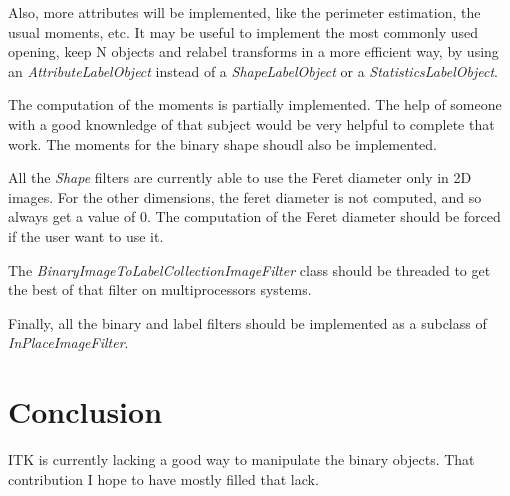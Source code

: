 \documentclass{InsightArticle}
\begin{document}
Also, more attributes will be implemented, like the perimeter estimation, the usual moments, etc. It may be useful to implement the most commonly used opening, keep N objects and relabel transforms in a more efficient way, by using an {\em AttributeLabelObject} instead of a {\em ShapeLabelObject} or a {\em StatisticsLabelObject}.

The computation of the moments is partially implemented. The help of someone with a good knownledge of that subject would be very helpful to complete that work. The moments for the binary shape shoudl also be implemented.

All the {\em Shape} filters are currently able to use the Feret diameter only in 2D images. For the other dimensions, the feret diameter is not computed, and so always get a value of $0$. The computation of the Feret diameter should be forced if the user want to use it.

The {\em BinaryImageToLabelCollectionImageFilter} class should be threaded to get the best of that filter on multiprocessors systems.

Finally, all the binary and label filters should be implemented as a subclass of {\em InPlaceImageFilter}.

\section{Conclusion}

ITK is currently lacking a good way to manipulate the binary objects. That contribution I hope to have mostly
filled that lack.

\appendix





\nocite{ITKSoftwareGuide}
\end{document}
